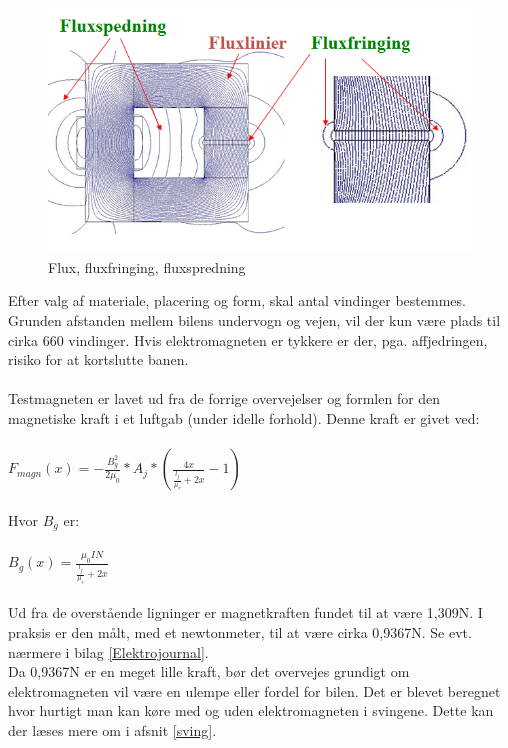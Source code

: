 \begin{figure}
\includegraphics[scale=0.4]{./Graphics/Flux}
\caption{Flux, fluxfringing, fluxspredning}
\label{Flux}
\end{figure}

Efter valg af materiale, placering og form, skal antal vindinger bestemmes. Grunden afstanden mellem bilens undervogn og vejen, vil der kun være plads til cirka 660 vindinger. Hvis elektromagneten er tykkere er der, pga. affjedringen, risiko for at kortslutte banen.\\
\\
Testmagneten er lavet ud fra de forrige overvejelser og formlen for den magnetiske kraft i et luftgab (under idelle forhold). Denne kraft er givet ved:\\
\\
$F_{magn}(x)=-{\frac{B^{2}_{g}}{2\mu_{0}}}* {A_{j}}* (\frac{4x}{{\frac{l_{j}}{\mu_{r}}}+2x}-1) $
\\
\\
Hvor $B_{g}$ er:
\\
\\
$ B_{g}(x)=\frac{\mu_{0}IN}{{\frac{l_{j}}{\mu_{r}}}+2x} $
\\
\\
Ud fra de overstående ligninger er magnetkraften fundet til at være 1,309N. I praksis er den målt, med et newtonmeter, til at være cirka 0,9367N. Se evt. nærmere i bilag \ref{Elektrojournal}. \\
Da 0,9367N er en meget lille kraft, bør det overvejes grundigt om elektromagneten vil være en ulempe eller fordel for bilen. Det er blevet beregnet hvor hurtigt man kan køre med og uden elektromagneten i svingene. Dette kan der læses mere om i afsnit \ref{sving}.\\

